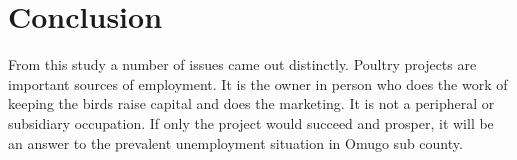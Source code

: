 \chapter{Conclusion}

From this study a number of issues came out distinctly. Poultry projects are important sources of employment. It is the owner in person who does the work of keeping the birds raise capital and does the marketing. It is not a peripheral or subsidiary occupation. If only the project would succeed and prosper, it will be an answer to the prevalent unemployment situation in Omugo sub county.
